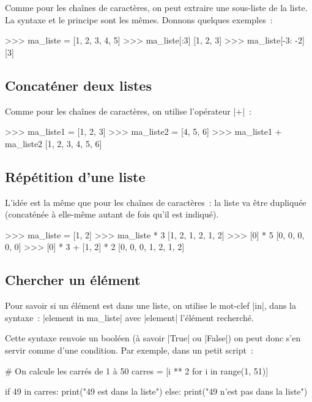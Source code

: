 		Comme pour les chaînes de caractères, on peut extraire une sous-liste de la liste. La syntaxe et le principe sont les mêmes.
		Donnons quelques exemples~:
		
		\begin{pythoncode}
			>>> ma_liste = [1, 2, 3, 4, 5]
			>>> ma_liste[:3]
			[1, 2, 3]
			>>> ma_liste[-3: -2]
			[3]
		\end{pythoncode}
	
	\subsection{Concaténer deux listes}
	
		Comme pour les chaînes de caractères, on utilise l'opérateur \python|+|~:
		\begin{pythoncode}
			>>> ma_liste1 = [1, 2, 3]
			>>> ma_liste2 = [4, 5, 6]
			>>> ma_liste1 + ma_liste2
			[1, 2, 3, 4, 5, 6]
		\end{pythoncode}
	
	\subsection{Répétition d'une liste}
		
		L'idée est la même que pour les chaînes de caractères~: la liste va être dupliquée (concaténée à elle-même autant de fois qu'il est indiqué).
		\begin{pythoncode}
			>>> ma_liste = [1, 2]
			>>> ma_liste * 3
			[1, 2, 1, 2, 1, 2]
			>>> [0] * 5
			[0, 0, 0, 0, 0]
			>>> [0] * 3 + [1, 2] * 2
			[0, 0, 0, 1, 2, 1, 2]
		\end{pythoncode}
	
	\subsection{Chercher un élément}
		
		Pour savoir si un élément est dans une liste, on utilise le mot-clef \python|in|, dans la syntaxe~: \python|element in ma_liste| avec \python|element| l'élément recherché.
		
		Cette syntaxe renvoie un booléen (à savoir \python|True| ou \python|False|) on peut donc s'en servir comme d'une condition.
		Par exemple, dans un petit script~:
		
		\begin{pythoncode}
			# On calcule les carrés de 1 à 50
			carres = [i ** 2 for i in range(1, 51)]
			
			if 49 in carres:
				print("49 est dans la liste")
			else:
				print("49 n'est pas dans la liste")
		\end{pythoncode}
			
